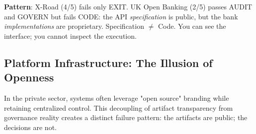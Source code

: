 \documentclass{article}
\begin{document}
\textbf{Pattern}: X-Road (4/5) fails only EXIT. UK Open Banking (2/5) passes AUDIT and GOVERN but fails CODE: the API \textit{specification} is public, but the bank \textit{implementations} are proprietary. Specification $\neq$ Code. You can see the interface; you cannot inspect the execution.

\subsection{Platform Infrastructure: The Illusion of Openness}

In the private sector, systems often leverage "open source" branding while retaining centralized control. This decoupling of artifact transparency from governance reality creates a distinct failure pattern: the artifacts are public; the decisions are not.
\end{document}
